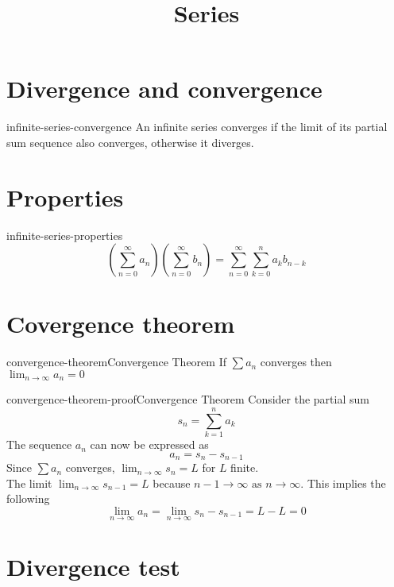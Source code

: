 \documentclass[preview]{standalone}
\begin{document}
\title{Series}
\genpage

\section{Divergence and convergence}

\begin{snippet}{infinite-series-convergence}
An infinite series converges if the limit
of its partial sum sequence also converges,
otherwise it diverges.
\end{snippet}

\section{Properties}

\begin{snippettheorem}{infinite-series-properties}{}
    \[
        \left(
            \sum_{n=0}^\infty a_n
        \right)
        \left(
            \sum_{n=0}^\infty b_n
        \right)
        =
        \sum_{n=0}^\infty \sum_{k=0}^n a_k b_{n-k}
    \]
\end{snippettheorem}

\section{Covergence theorem}

\begin{snippettheorem}{convergence-theorem}{Convergence Theorem}
    If \(\sum a_n\) converges then \(\lim_{n\to\infty}a_n=0\)
\end{snippettheorem}

\begin{snippetproof}{convergence-theorem-proof}{Convergence Theorem}
    Consider the partial sum
    \[
        s_n = \sum_{k=1}^{n}a_k
    \]
    The sequence \(a_n\) can now be expressed as
    \[
        a_n = s_n - s_{n-1}
    \]
    Since \(\sum a_n\) converges, \(\lim_{n\to\infty}s_n=L\) for \(L\) finite. \\
    The limit \(\lim_{n\to\infty}s_{n-1}=L\) because \(n-1 \to \infty \text{ as } n \to \infty\).
    This implies the following
    \[
        \lim_{n \to \infty} a_n
        = \lim_{n \to \infty} s_n - s_{n-1} = L - L = 0
    \]
\end{snippetproof}

\section{Divergence test}
\end{document}
